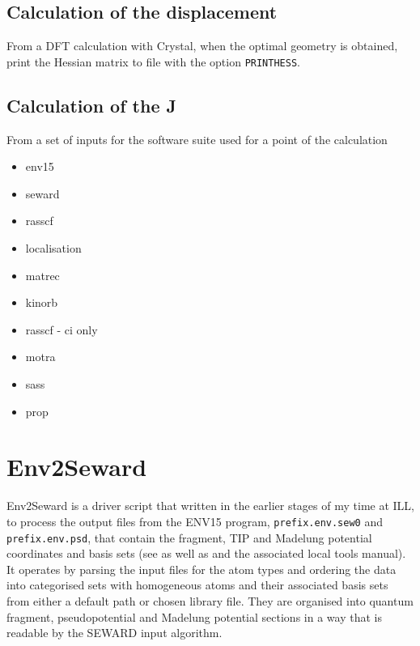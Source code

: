 \documentclass[10pt]{article}
\begin{document}
\subsection{Calculation of the displacement}
From a DFT calculation with Crystal, when the optimal geometry is obtained, print the Hessian matrix to file with the option \verb|PRINTHESS|.


\subsection{Calculation of the J}

From a set of inputs for the software suite used for a point of the calculation
\begin{itemize}
	\item env15
	\item seward
	\item rasscf
	\item localisation
	\item matrec
	\item kinorb
	\item rasscf - ci only
	\item motra
	\item sass
	\item prop
\end{itemize}

\section{Env2Seward}
Env2Seward is a driver script that written in the earlier stages of my time at ILL, to process the output files from the ENV15 program, \texttt{prefix.env.sew0} and \texttt{prefix.env.psd}, that contain the fragment, TIP and Madelung potential coordinates and basis sets (see \cite{varignon2013ab} as well as \cite{gelle2008fast} and the associated local tools manual). It operates by parsing the input files for the atom types and ordering the data into categorised sets with homogeneous atoms and their associated basis sets from either a default path or chosen library file. They are organised into quantum fragment, pseudopotential and Madelung potential sections in a way that is readable by the SEWARD input algorithm.



\end{document}
